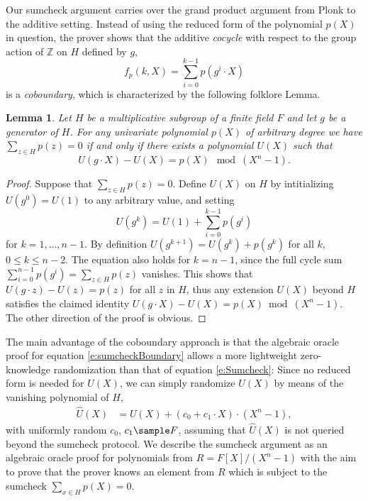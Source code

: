\documentclass[10pt,article,oneside]{memoir}
\newtheorem{lem}[]{Lemma}
\theoremstyle{definition}
\theoremstyle{remark}
\newcommand{\Z}{\mathbb{Z}}
\begin{document}
\medskip
Our sumcheck argument carries over the grand product argument from Plonk \cite{Plonk} to the additive setting.
Instead of using the reduced form of the polynomial $p(X)$ in question, the prover shows that the additive \textit{cocycle} with respect to the group action of $\Z$ on $H$ defined by $g$,
\begin{equation}
f_p(k,X) = \sum_{i=0}^{k-1} p(g^i\cdot X)
\end{equation}  
is a \textit{coboundary}, which is characterized by the following folklore Lemma.
\begin{lem}
\label{lem:coboundary}
Let $H$ be a multiplicative subgroup of a finite field $F$ and let $g$ be a generator of $H$.
For any univariate polynomial $p(X)$ of arbitrary degree we have $\sum_{z\in H} p(z) = 0$ if and only if there exists a polynomial $U(X)$ such that 
\begin{equation}
\label{e:sumcheckBoundary}
U(g\cdot X) - U(X) =  p(X) \mod (X^n-1).
\end{equation}
\end{lem}

\begin{proof}%
Suppose that $\sum_{z\in H} p(z) = 0$. 
Define $U(X)$ on $H$ by intitializing $U(g^0) = U(1)$ to any arbitrary value, and setting
\[
U(g^k) = U(1) +\sum_{i=0}^{k-1} p(g^i)
\]
for $k=1,\ldots, n-1$.
By definition $U(g^{k+1}) = U(g^k) + p(g^k)$ for all $k$, $0\leq k\leq n-2$.
The equation also holds for $k=n-1$, since the full cycle sum $\sum_{i=0}^{n-1}p(g^i) = \sum_{z\in H} p(z) $ vanishes. 
This shows that $U(g\cdot z)-U(z) = p(z)$ for all $z$ in $H$, thus any extension $U(X)$ beyond $H$ satisfies the claimed identity $U(g\cdot X)-U(X)=p(X) \bmod (X^n-1)$.
The other direction of the proof is obvious.
\end{proof}

\medskip
The main advantage of the coboundary approach is that the algebraic oracle proof for equation \eqref{e:sumcheckBoundary} allows a more lightweight zero-knowledge randomization than that of equation \eqref{e:Sumcheck}:
Since no reduced form is needed for $U(X)$,  we can simply randomize $U(X)$ by means of the vanishing polynomial of $H$, 
\begin{align}
\label{e:sumcheckRand2}
\hat U(X) &= U(X) + (c_0 + c_1\cdot X) \cdot (X^n-1),
\end{align}
with uniformly random $c_0$, $c_1\sample F$, assuming that $\hat U(X)$ is not queried beyond the sumcheck protocol.
We describe the sumcheck argument as an algebraic oracle proof for polynomials from $R= F[X]/(X^n-1)$ with the aim to prove that the prover knows an element from  $R$ which is subject to the sumcheck $\sum_{x\in H} p(X) = 0$.
\end{document}

